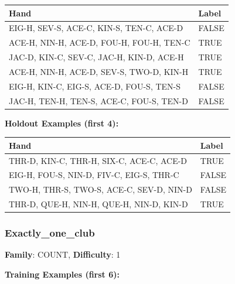 \documentclass[10pt,a4paper]{article}
\begin{document}
\begin{small}
\begin{tabular}{p{8cm}l}
\toprule
Hand & Label \\
\midrule
EIG-H, SEV-S, ACE-C, KIN-S, TEN-C, ACE-D & \textcolor{negative}{FALSE} \\
ACE-H, NIN-H, ACE-D, FOU-H, FOU-H, TEN-C & \textcolor{positive}{TRUE} \\
JAC-D, KIN-C, SEV-C, JAC-H, KIN-D, ACE-H & \textcolor{positive}{TRUE} \\
ACE-H, NIN-H, ACE-D, SEV-S, TWO-D, KIN-H & \textcolor{positive}{TRUE} \\
EIG-H, KIN-C, EIG-S, ACE-D, FOU-S, TEN-S & \textcolor{negative}{FALSE} \\
JAC-H, TEN-H, TEN-S, ACE-C, FOU-S, TEN-D & \textcolor{negative}{FALSE} \\
\bottomrule
\end{tabular}
\end{small}

\textbf{Holdout Examples (first 4):}

\begin{small}
\begin{tabular}{p{8cm}l}
\toprule
Hand & Label \\
\midrule
THR-D, KIN-C, THR-H, SIX-C, ACE-C, ACE-D & \textcolor{positive}{TRUE} \\
EIG-H, FOU-S, NIN-D, FIV-C, EIG-S, THR-C & \textcolor{negative}{FALSE} \\
TWO-H, THR-S, TWO-S, ACE-C, SEV-D, NIN-D & \textcolor{negative}{FALSE} \\
THR-D, QUE-H, NIN-H, QUE-H, NIN-D, KIN-D & \textcolor{positive}{TRUE} \\
\bottomrule
\end{tabular}
\end{small}

\vspace{0.5cm}

\subsubsection{Exactly\_one\_club}

\textbf{Family}: COUNT, \textbf{Difficulty}: 1

\textbf{Training Examples (first 6):}
\end{document}
